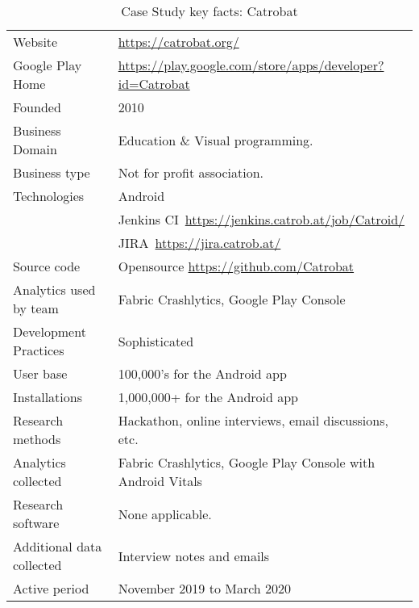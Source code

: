 {\renewcommand{\arraystretch}{0.8}%
\begin{table}[htbp!]
    \centering
    \small
    \setlength{\tabcolsep}{1pt}
    \begin{tabular}{ll}
       \toprule
       Website &\url{https://catrobat.org/} \\
       Google Play Home & \url{https://play.google.com/store/apps/developer?id=Catrobat} \\
       Founded & 2010 \\
       Business Domain & Education \& Visual programming. \\
       Business type & Not for profit association. \\
       Technologies  & Android \\
       & Jenkins CI~\url{https://jenkins.catrob.at/job/Catroid/}  \\
       & JIRA~\url{https://jira.catrob.at/} \\
       Source code  & Opensource \url{https://github.com/Catrobat} \\
       Analytics used by team & Fabric Crashlytics, Google Play Console \\
       Development Practices & Sophisticated~\footnotemark \\
       \midrule
       User base & 100,000's for the Android app \\
       Installations & 1,000,000+ for the Android app \\
       \midrule
       Research methods &Hackathon, online interviews, email discussions, etc. \\
       Analytics collected &Fabric Crashlytics, Google Play Console with Android Vitals \\
       Research software & None applicable. \\
       Additional data collected &Interview notes and emails \\
       Active period & November 2019 to March 2020 \\
       \bottomrule
    \end{tabular}
    \caption{Case Study key facts: Catrobat}
    \label{tab:blank_case_study_anaytics_overview}
\end{table}
}


